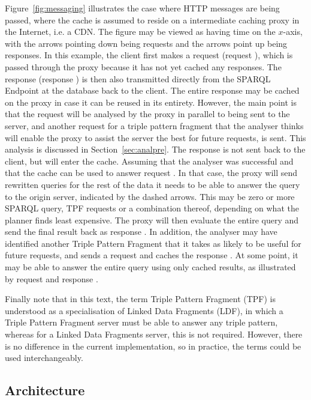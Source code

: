 Figure~\ref{fig:messaging} illustrates the case where HTTP messages
are being passed, where the cache is assumed to reside on a
intermediate caching proxy in the Internet, i.e. a CDN. The figure
may be viewed as having time on the $x$-axis, with the arrows pointing
down being requests and the arrows point up being responses. In this
example, the client first makes a request (request ), which
is passed through the proxy because it has not yet cached any
responses. The response (response ) is then also
transmitted directly from the SPARQL Endpoint at the database back to
the client. The entire response may be cached on the proxy in case it
can be reused in its entirety. However, the main point is that the
request will be analysed by the proxy in parallel to being sent to the
server, and another request  for a triple pattern fragment
that the analyser thinks will enable the proxy to assist the server
the best for future requests, is sent. This analysis is discussed in
Section~\ref{sec:analpre}. The response  is not sent back
to the client, but will enter the cache. Assuming that the analyser
was successful and that the cache can be used to answer request
. In that case, the proxy will send rewritten queries for
the rest of the data it needs to be able to answer the query to the
origin server, indicated by the dashed arrows. This may be zero or more SPARQL
query, TPF requests or a combination thereof, depending on what the
planner finds least expensive. The proxy will then evaluate the entire
query and send the final result back as response . In
addition, the analyser may have identified another Triple Pattern
Fragment that it takes as likely to be useful for future requests, and
sends a request and caches the response . At some point, it
may be able to answer the entire query using only cached results, as
illustrated by request and response .

Finally note that in this text, the term Triple Pattern Fragment (TPF)
is understood as a specialisation of Linked Data Fragments (LDF), in
which a Triple Pattern Fragment server must be able to answer any
triple pattern, whereas for a Linked Data Fragments server, this is
not required. However, there is no difference in the current
implementation, so in practice, the terms could be used
interchangeably.


\subsection{Architecture}\label{sec:arch}

